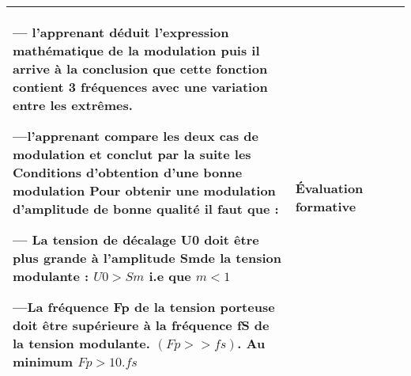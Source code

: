\documentclass[12pt]{article}
\begin{document}
\begin{center}
\begin{tabular}{|p{}||p{}||p{}||p{}|}
--- l'apprenant déduit l'expression mathématique de la modulation puis il arrive à la conclusion que cette fonction contient 3 fréquences avec une variation entre les extrêmes.

\vspace{0.5cm}
---l'apprenant compare les deux cas de modulation et conclut par la suite les Conditions d’obtention d’une bonne modulation
Pour obtenir une modulation d’amplitude de bonne qualité il faut que :

	---  La tension de décalage U0 doit être plus grande à l’amplitude Smde la
tension modulante : $U0 > Sm$ i.e que $m < 1$

	---La fréquence Fp de la tension porteuse doit être supérieure à la
fréquence fS de la tension modulante. $(Fp >> fs)$. Au minimum
$Fp > 10.fs$ 
				  & 
	Évaluation formative\\\hline 
\end{tabular}
\end{center}
\end{document}
